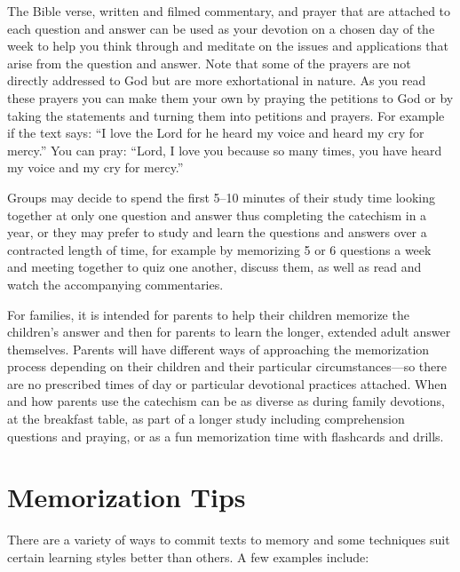 \documentclass[titlepage]{memoir}
\begin{document}
The Bible verse, written and filmed commentary, and prayer that are attached to each question and answer can be used as your devotion on a chosen day of the week to help you think through and meditate on the issues and applications that arise from the question and answer. Note that some of the prayers are not directly addressed to God but are more exhortational in nature. As you read these prayers you can make them your own by praying the petitions to God or by taking the statements and turning them into petitions and prayers. For example if the text says: ``I love the Lord for he heard my voice and heard my cry for mercy.'' You can pray: ``Lord, I love you because so many times, you have heard my voice and my cry for mercy.''

Groups may decide to spend the first 5--10 minutes of their study time looking together at only one question and answer thus completing the catechism in a year, or they may prefer to study and learn the questions and answers over a contracted length of time, for example by memorizing 5 or 6 questions a week and meeting together to quiz one another, discuss them, as well as read and watch the accompanying commentaries.

For families, it is intended for parents to help their children memorize the children's answer and then for parents to learn the longer, extended adult answer themselves. Parents will have different ways of approaching the memorization process depending on their children and their particular circumstances\thinspace{}---\thinspace{}so there are no prescribed times of day or particular devotional practices attached. When and how parents use the catechism can be as diverse as during family devotions, at the breakfast table, as part of a longer study including comprehension questions and praying, or as a fun memorization time with flashcards and drills.

\section{Memorization Tips}
There are a variety of ways to commit texts to memory and some techniques suit certain learning styles better than others. A few examples include:
\end{document}
